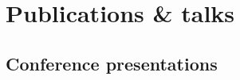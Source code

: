 \documentclass[10pt, letterpaper]{article}
\newcommand{\years}[1]{\marginnote{\small #1}} %
\begin{document}




\section*{Publications \& talks}

\subsection*{Conference presentations}
\noindent
\end{document}
